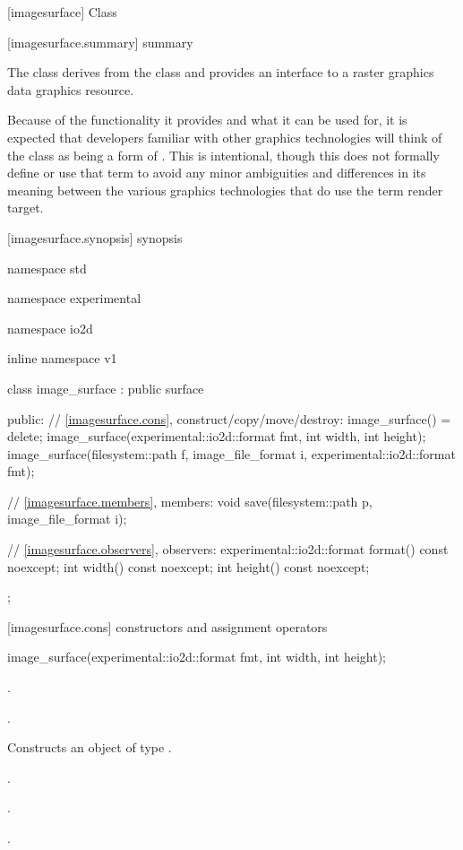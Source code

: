  [imagesurface] {Class }

 [imagesurface.summary] { summary}

\pnum
{}
The class  derives from the  class and provides an interface to a raster graphics data graphics resource.

\pnum
\enternote
Because of the functionality it provides and what it can be used for, it is expected that developers familiar with other graphics technologies will think of the  class as being a form of . This is intentional, though this \documenttypename{} does not formally define or use that term to avoid any minor ambiguities and differences in its meaning between the various graphics technologies that do use the term render target.
\exitnote

 [imagesurface.synopsis] { synopsis}

\begin{codeblock}
namespace std { namespace experimental { namespace io2d { inline namespace v1 {
  class image_surface : public surface {
  public:
    // \ref{imagesurface.cons}, construct/copy/move/destroy:
    image_surface() = delete;
    image_surface(experimental::io2d::format fmt, int width, int height);
    image_surface(filesystem::path f, image_file_format i, 
      experimental::io2d::format fmt);
    
    // \ref{imagesurface.members}, members:
    void save(filesystem::path p, image_file_format i);
    
    // \ref{imagesurface.observers}, observers:
    experimental::io2d::format format() const noexcept;
    int width() const noexcept;
    int height() const noexcept;
  };
} } } }
\end{codeblock}

 [imagesurface.cons] { constructors and assignment operators}

\begin{itemdecl}
image_surface(experimental::io2d::format fmt, int width, int height);
\end{itemdecl}
\begin{itemdescr}
\pnum
\preconditions
{}.

\pnum
{}.

\pnum
\effects
Constructs an object of type .

\pnum
\postconditions
{}.

\pnum
{}.

\pnum
{}.
\end{itemdescr}

